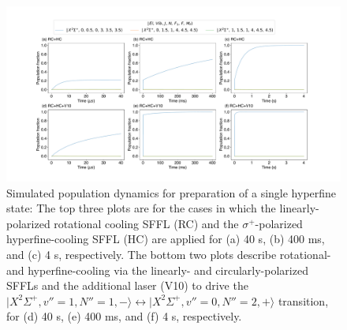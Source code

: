 \documentclass[nofootinbib,aip,jcp,reprint]{revtex4-1}
\begin{document}
\begin{figure}[htbp!]
  \centering
  \includegraphics[width=16.5cm]{RCHC_RCHCV10}
  \caption
  {Simulated population dynamics for preparation of a single hyperfine state: The top three plots are for the cases in which the linearly-polarized rotational cooling SFFL (RC) and the $\sigma^+$-polarized hyperfine-cooling SFFL (HC) are applied for (a) 40 {\micro}s, (b) 400 ms, and (c) 4 s, respectively. The bottom two plots describe rotational- and hyperfine-cooling via the linearly- and circularly-polarized SFFLs and the additional laser (V10) to drive the $\lvert X^2\Sigma^+, v''=1, N''=1, -\rangle \leftrightarrow \lvert X^2\Sigma^+, v''=0, N''=2, +\rangle$ transition, for (d) 40 {\micro}s, (e) 400 ms, and (f) 4 s, respectively.
}\label{RCHC_RCHCV10}
\end{figure}
\end{document}
